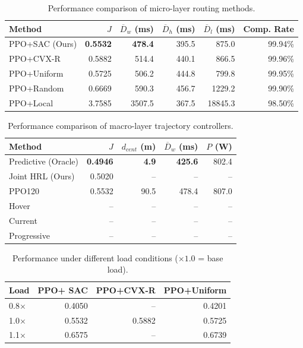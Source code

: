 ﻿
\begin{table}[tbp]
\centering
\caption{Performance comparison of micro-layer routing methods.}
\label{tab:micro_routing}
\begin{tabular}{@{}lrrrrr@{}}
\toprule
Method & $J$ & $\overline{D}_w$ (ms) & $\overline{D}_h$ (ms) & $\overline{D}_l$ (ms) & Comp. Rate \\
\midrule
PPO+SAC (Ours) & \textbf{0.5532} & \textbf{478.4} & 395.5 & 875.0 & 99.94\% \\
PPO+CVX-R & 0.5882 & 514.4 & 440.1 & 866.5 & 99.96\% \\
PPO+Uniform & 0.5725 & 506.2 & 444.8 & 799.8 & 99.95\% \\
PPO+Random & 0.6669 & 590.3 & 456.7 & 1229.2 & 99.90\% \\
PPO+Local & 3.7585 & 3507.5 & 367.5 & 18845.3 & 98.50\% \\
\bottomrule
\end{tabular}
\end{table}

\begin{table}[tbp]
\centering
\caption{Performance comparison of macro-layer trajectory controllers.}
\label{tab:macro_trajectory}
\begin{tabular}{@{}lrrrr@{}}
\toprule
Method & $J$ & $d_{cent}$ (m) & $\overline{D}_w$ (ms) & $P$ (W) \\
\midrule
Predictive (Oracle) & \textbf{0.4946} & \textbf{4.9} & \textbf{425.6} & 802.4 \\
Joint HRL (Ours) & 0.5020 & -- & -- & -- \\
PPO120 & 0.5532 & 90.5 & 478.4 & 807.0 \\
Hover & -- & -- & -- & -- \\
Current & -- & -- & -- & -- \\
Progressive & -- & -- & -- & -- \\
\bottomrule
\end{tabular}
\end{table}

\begin{table}[tbp]
\centering
\caption{Performance under different load conditions ($\times 1.0$ = base load).}
\label{tab:load_sensitivity}
\begin{tabular}{@{}lrrr@{}}
\toprule
Load & PPO+ SAC & PPO+CVX-R & PPO+Uniform \\
\midrule
0.8$\times$ & 0.4050 & -- & 0.4201 \\
1.0$\times$ & 0.5532 & 0.5882 & 0.5725 \\
1.1$\times$ & 0.6575 & -- & 0.6739 \\
\bottomrule
\end{tabular}
\end{table}

